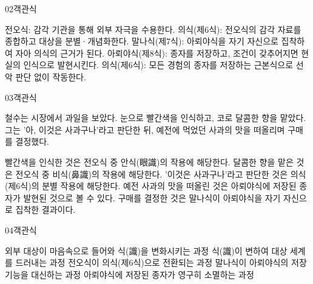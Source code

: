 \documentclass[fs85,seriesWit]{korfarm-base}
\begin{document}
\begin{kfQBlock}{02}{객관식}
\begin{kfChoices}
\kfChoice 전오식: 감각 기관을 통해 외부 자극을 수용한다.
\kfChoice 의식(제6식): 전오식의 감각 자료를 종합하고 대상을 분별·개념화한다.
\kfChoice 말나식(제7식): 아뢰야식을 자기 자신으로 집착하여 자아 의식의 근거가 된다.
\kfChoice 아뢰야식(제8식): 종자를 저장하고, 조건이 갖추어지면 현실의 인식으로 발현시킨다.
\kfChoice 의식(제6식): 모든 경험의 종자를 저장하는 근본식으로 선악 판단 없이 작동한다.
\end{kfChoices}
\end{kfQBlock}

\begin{kfQBlock}{03}{객관식}
\begin{kfEvidence}철수는 시장에서 과일을 보았다. 눈으로 빨간색을 인식하고, 코로 달콤한 향을 맡았다. 그는 '아, 이것은 사과구나'라고 판단한 뒤, 예전에 먹었던 사과의 맛을 떠올리며 구매를 결정했다.\end{kfEvidence}
\begin{kfChoices}
\kfChoice 빨간색을 인식한 것은 전오식 중 안식(眼識)의 작용에 해당한다.
\kfChoice 달콤한 향을 맡은 것은 전오식 중 비식(鼻識)의 작용에 해당한다.
\kfChoice '이것은 사과구나'라고 판단한 것은 의식(제6식)의 분별 작용에 해당한다.
\kfChoice 예전 사과의 맛을 떠올린 것은 아뢰야식에 저장된 종자가 발현된 것으로 볼 수 있다.
\kfChoice 구매를 결정한 것은 말나식이 아뢰야식을 자기 자신으로 집착한 결과이다.
\end{kfChoices}
\end{kfQBlock}

\begin{kfQBlock}{04}{객관식}
\begin{kfChoices}
\kfChoice 외부 대상이 마음속으로 들어와 식(識)을 변화시키는 과정
\kfChoice 식(識)이 변하여 대상 세계를 드러내는 과정
\kfChoice 전오식이 의식(제6식)으로 전환되는 과정
\kfChoice 말나식이 아뢰야식의 저장 기능을 대신하는 과정
\kfChoice 아뢰야식에 저장된 종자가 영구히 소멸하는 과정
\end{kfChoices}
\end{kfQBlock}

\kfEndMC
\end{document}
